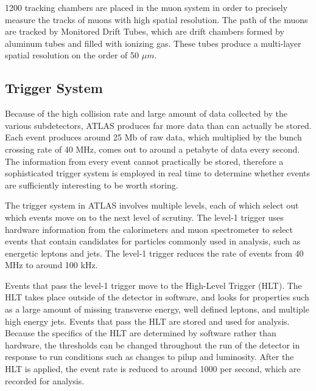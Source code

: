 1200 tracking chambers are placed in the muon system in order to precisely measure the tracks of muons with high spatial resolution. The path of the muons are tracked by Monitored Drift Tubes, which are drift chambers formed by aluminum tubes and filled with ionizing gas. These tubes produce a multi-layer spatial resolution on the order of 50 $\mu m$.


\subsection{Trigger System}
\label{sec:trigger}

Because of the high collision rate and large amount of data collected by the various subdetectors, ATLAS produces far more data than can actually be stored. Each event produces around 25 Mb of raw data, which multiplied by the bunch crossing rate of 40 MHz, comes out to around a petabyte of data every second. The information from every event cannot practically be stored, therefore a sophisticated trigger system is employed in real time to determine whether events are sufficiently interesting to be worth storing.

The trigger system in ATLAS involves multiple levels, each of which select out which events move on to the next level of scrutiny. The level-1 trigger uses hardware information from the calorimeters and muon spectrometer to select events that contain candidates for particles commonly used in analysis, such as energetic leptons and jets. The level-1 trigger reduces the rate of events from 40 MHz to around 100 kHz. 

Events that pass the level-1 trigger move to the High-Level Trigger (HLT). The HLT takes place outside of the detector in software, and looks for properties such as a large amount of missing transverse energy, well defined leptons, and multiple high energy jets. Events that pass the HLT are stored and used for analysis. Because the specifics of the HLT are determined by software rather than hardware, the thresholds can be changed throughout the run of the detector in response to run conditions such as changes to pilup and luminosity. After the HLT is applied, the event rate is reduced to around 1000 per second, which are recorded for analysis.
